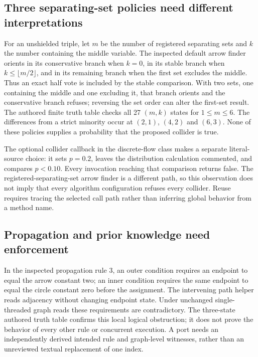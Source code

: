 \subsection{Three separating-set policies need different interpretations}
For an unshielded triple, let $m$ be the number of registered separating sets
and $k$ the number containing the middle variable. The inspected default
arrow finder orients in its conservative branch when $k=0$, in its stable
branch when $k\leq\lfloor m/2\rfloor$, and in its remaining branch when the
first set excludes the middle. Thus an exact half vote is included by the
stable comparison. With two sets, one containing the middle and one excluding
it, that branch orients and the conservative branch refuses; reversing the
set order can alter the first-set result. The authored finite truth table
checks all 27 $(m,k)$ states for $1\leq m\leq6$. The differences from a strict
minority occur at $(2,1)$, $(4,2)$ and $(6,3)$. None of these policies supplies
a probability that the proposed collider is true.~\citep{exec28_fj_java,exec28_fj_reference}

The optional collider callback in the discrete-flow class makes a separate
literal-source choice: it sets $p=0.2$, leaves the distribution calculation
commented, and compares $p<0.10$. Every invocation reaching that comparison
returns false. The registered-separating-set arrow finder is a different
path, so this observation does not imply that every algorithm configuration
refuses every collider. Reuse requires tracing the selected call path rather
than inferring global behavior from a method name.~\citep{exec28_fj_java}

\subsection{Propagation and prior knowledge need enforcement}
In the inspected propagation rule 3, an outer condition requires an endpoint
to equal the arrow constant two; an inner condition requires the same endpoint
to equal the circle constant zero before the assignment. The intervening path
helper reads adjacency without changing endpoint state. Under unchanged
single-threaded graph reads these requirements are contradictory. The
three-state authored truth table confirms this local logical obstruction;
it does not prove the behavior of every other rule or concurrent execution.
A port needs an independently derived intended rule and graph-level witnesses,
rather than an unreviewed textual replacement of one index.
\citep{exec28_fj_java,exec28_fj_reference}

